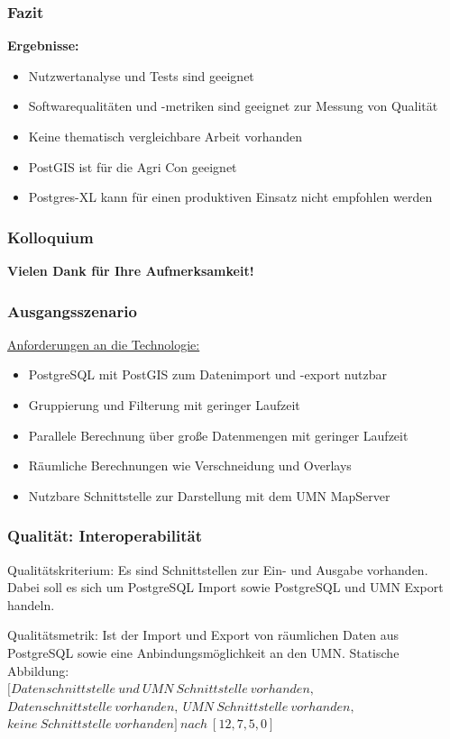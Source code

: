 \documentclass{beamer}
\begin{document}
\begin{frame}\frametitle{Fazit}
\textbf{Ergebnisse:}\\
\begin{itemize}
\item Nutzwertanalyse und Tests sind geeignet%
\item Softwarequalitäten und -metriken sind geeignet zur Messung von Qualität
\item Keine thematisch vergleichbare Arbeit vorhanden
\item PostGIS ist für die Agri Con geeignet
\item Postgres-XL kann für einen produktiven Einsatz nicht empfohlen werden
\end{itemize}
\end{frame}
 
\begin{frame}\frametitle{Kolloquium}
\begin{center}
\textbf{Vielen Dank für Ihre Aufmerksamkeit!}
\end{center}
\end{frame} 
 
\begin{frame}\frametitle{}

\end{frame} 

\begin{frame}\frametitle{Ausgangsszenario}
\underline{Anforderungen an die Technologie:}
\begin{itemize}
\item PostgreSQL mit PostGIS zum Datenimport und -export nutzbar
\item Gruppierung und Filterung mit geringer Laufzeit
\item Parallele Berechnung über große Datenmengen mit geringer Laufzeit
\item Räumliche Berechnungen wie Verschneidung und Overlays
\item Nutzbare Schnittstelle zur Darstellung mit dem UMN MapServer
\end{itemize}
\end{frame}
 
\begin{frame}\frametitle{Qualität: Interoperabilität}
\begin{block}{Qualitätskriterium:}
Es sind Schnittstellen zur Ein- und Ausgabe vorhanden. Dabei soll es sich um PostgreSQL Import sowie PostgreSQL und UMN Export handeln.
\end{block}

\begin{block}{Qualitätsmetrik:}
Ist der Import und Export von räumlichen Daten aus PostgreSQL sowie eine Anbindungsmöglichkeit an den UMN.
Statische Abbildung:\\
$[Datenschnittstelle\ und\ UMN\ Schnittstelle\ vorhanden,$\\$Datenschnittstelle\ vorhanden,\ UMN\ Schnittstelle\ vorhanden,$\\$keine\ Schnittstelle\ vorhanden]\ nach\ [12,7,5,0]$
\end{block}
\end{frame} 
\end{document}

